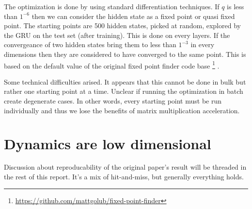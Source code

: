 \documentclass{article}
\begin{document}
The optimization is done by using standard differentiation techniques. If $q$ is less than  $1^{-6}$ then we can consider the hidden state as a fixed point or quasi fixed point. The starting points are 500 hidden states, picked at random, explored by the GRU on the test set (after training). This is done on every layers. If the convergeance of two hidden states bring them to less than $1^{-3}$ in every dimensions then they are considered to have converged to the same point. This is based on the default value of the original fixed point finder code base \footnote{\url{https://github.com/mattgolub/fixed-point-finder}} \cite{Golub2018}.

Some technical difficulties arised. It appears that this cannot be done in bulk but rather one starting point at a time. Unclear if running the optimization in batch create degenerate cases. In other words, every starting point must be run individually and thus we lose the benefits of matrix multiplication acceleration.

\section{Dynamics are low dimensional}

Discussion about reproducability of the original paper's result will be threaded in the rest of this report. It's a mix of hit-and-miss, but generally everything holds.
\end{document}
